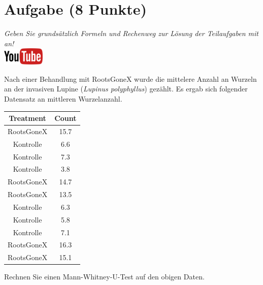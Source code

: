 \documentclass[a4paper, 10pt]{scrartcl}\usepackage[]{graphicx}\usepackage[]{xcolor}
\newenvironment{knitrout}{}{} %
\begin{document}
\section{Aufgabe \hfill (8 Punkte)}

\textit{Geben Sie grunds{\"a}tzlich Formeln und Rechenweg zur L{\"o}sung der
  Teilaufgaben mit an!} \\[1Ex]

\hfill\href{https://youtu.be/5tiJFxuZcco}{\includegraphics[width =
  2cm]{img/youtube}} %
\hspace{2Ex}




Nach einer Behandlung mit RootsGoneX wurde die mittelere Anzahl an Wurzeln
an der invasiven Lupine (\textit{Lupinus polyphyllus}) gez{\"a}hlt. Es ergab sich
folgender Datensatz an mittleren Wurzelanzahl.

\begin{knitrout}
\color{fgcolor}\begin{table}[!h]
\centering
\begin{tabular}{cc}
\toprule
Treatment & Count\\
\midrule
RootsGoneX & 15.7\\
Kontrolle & 6.6\\
Kontrolle & 7.3\\
Kontrolle & 3.8\\
RootsGoneX & 14.7\\
\addlinespace
RootsGoneX & 13.5\\
Kontrolle & 6.3\\
Kontrolle & 5.8\\
Kontrolle & 7.1\\
RootsGoneX & 16.3\\
\addlinespace
RootsGoneX & 15.1\\
\bottomrule
\end{tabular}
\end{table}

\end{knitrout}

Rechnen Sie einen Mann-Whitney-U-Test auf den obigen Daten.
\end{document}
